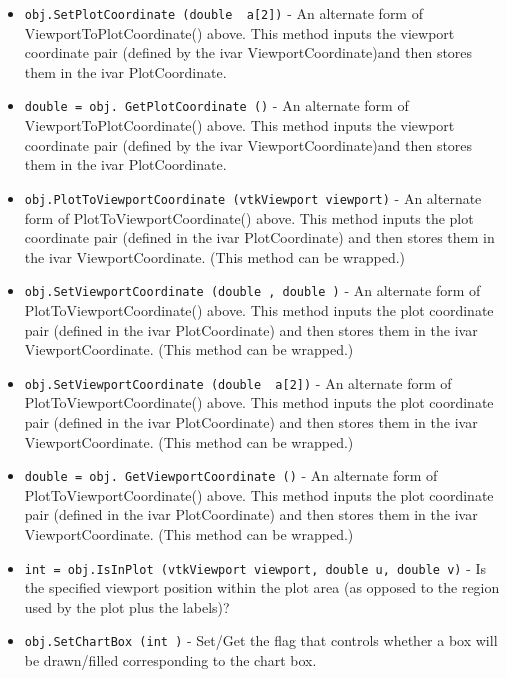 \begin{itemize}
\item  \verb|obj.SetPlotCoordinate (double  a[2])| -  An alternate form of ViewportToPlotCoordinate() above. This method
 inputs the viewport coordinate pair (defined by the ivar 
 ViewportCoordinate)and then stores them in the ivar PlotCoordinate. 

\item  \verb|double = obj. GetPlotCoordinate ()| -  An alternate form of ViewportToPlotCoordinate() above. This method
 inputs the viewport coordinate pair (defined by the ivar 
 ViewportCoordinate)and then stores them in the ivar PlotCoordinate. 

\item  \verb|obj.PlotToViewportCoordinate (vtkViewport viewport)| -  An alternate form of PlotToViewportCoordinate() above. This method
 inputs the plot coordinate pair (defined in the ivar PlotCoordinate)
 and then stores them in the ivar ViewportCoordinate. (This method 
 can be wrapped.)

\item  \verb|obj.SetViewportCoordinate (double , double )| -  An alternate form of PlotToViewportCoordinate() above. This method
 inputs the plot coordinate pair (defined in the ivar PlotCoordinate)
 and then stores them in the ivar ViewportCoordinate. (This method 
 can be wrapped.)

\item  \verb|obj.SetViewportCoordinate (double  a[2])| -  An alternate form of PlotToViewportCoordinate() above. This method
 inputs the plot coordinate pair (defined in the ivar PlotCoordinate)
 and then stores them in the ivar ViewportCoordinate. (This method 
 can be wrapped.)

\item  \verb|double = obj. GetViewportCoordinate ()| -  An alternate form of PlotToViewportCoordinate() above. This method
 inputs the plot coordinate pair (defined in the ivar PlotCoordinate)
 and then stores them in the ivar ViewportCoordinate. (This method 
 can be wrapped.)

\item  \verb|int = obj.IsInPlot (vtkViewport viewport, double u, double v)| -  Is the specified viewport position within the plot area (as opposed to the
 region used by the plot plus the labels)?

\item  \verb|obj.SetChartBox (int )| -  Set/Get the flag that controls whether a box will be drawn/filled
 corresponding to the chart box.


\end{itemize}
